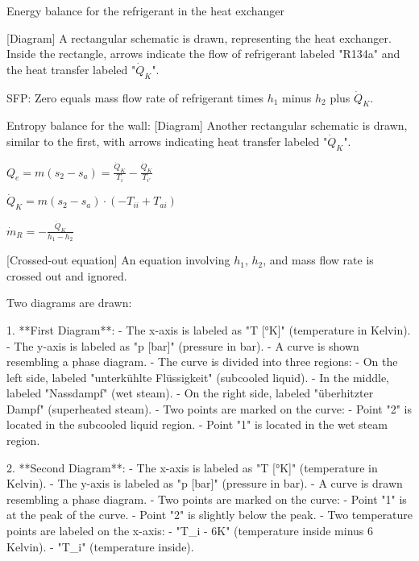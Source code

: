Energy balance for the refrigerant in the heat exchanger  

[Diagram]  
A rectangular schematic is drawn, representing the heat exchanger. Inside the rectangle, arrows indicate the flow of refrigerant labeled "R134a" and the heat transfer labeled "\( \dot{Q}_K \)".  

SFP:  
Zero equals mass flow rate of refrigerant times \( h_1 \) minus \( h_2 \) plus \( \dot{Q}_K \).  

Entropy balance for the wall:  
[Diagram]  
Another rectangular schematic is drawn, similar to the first, with arrows indicating heat transfer labeled "\( \dot{Q}_K \)".  

\( Q_e = m(s_2 - s_a) = \frac{\dot{Q}_K}{T_i} - \frac{\dot{Q}_K}{T_{i'} } \)  

\( \dot{Q}_K = m(s_2 - s_a) \cdot (-T_{ii} + T_{ai}) \)  

\( \dot{m}_R = -\frac{\dot{Q}_K}{h_1 - h_2} \)  

[Crossed-out equation]  
An equation involving \( h_1 \), \( h_2 \), and mass flow rate is crossed out and ignored.

Two diagrams are drawn:

1. **First Diagram**:  
   - The x-axis is labeled as "T [°K]" (temperature in Kelvin).  
   - The y-axis is labeled as "p [bar]" (pressure in bar).  
   - A curve is shown resembling a phase diagram.  
   - The curve is divided into three regions:  
     - On the left side, labeled "unterkühlte Flüssigkeit" (subcooled liquid).  
     - In the middle, labeled "Nassdampf" (wet steam).  
     - On the right side, labeled "überhitzter Dampf" (superheated steam).  
   - Two points are marked on the curve:  
     - Point "2" is located in the subcooled liquid region.  
     - Point "1" is located in the wet steam region.

2. **Second Diagram**:  
   - The x-axis is labeled as "T [°K]" (temperature in Kelvin).  
   - The y-axis is labeled as "p [bar]" (pressure in bar).  
   - A curve is drawn resembling a phase diagram.  
   - Two points are marked on the curve:  
     - Point "1" is at the peak of the curve.  
     - Point "2" is slightly below the peak.  
   - Two temperature points are labeled on the x-axis:  
     - "T_i - 6K" (temperature inside minus 6 Kelvin).  
     - "T_i" (temperature inside).